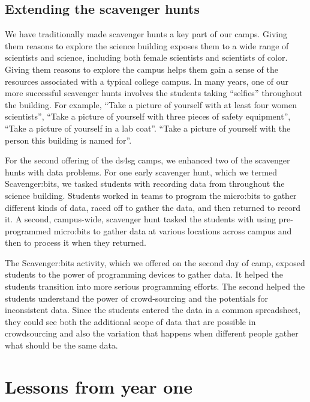 \subsection{Extending the scavenger hunts}

We have traditionally made scavenger hunts a key part of our camps.
Giving them reasons to explore the science building exposes them
to a wide range of scientists and science, including both female
scientists and scientists of color.  Giving them reasons to explore
the campus helps them gain a sense of the resources associated with
a typical college campus.  In many years, one of our more successful
scavenger hunts involves the students taking ``selfies'' throughout
the building.  For example, ``Take a picture of yourself with at
least four women scientists'', ``Take a picture of yourself with
three pieces of safety equipment'', ``Take a picture of yourself
in a lab coat''.  ``Take a picture of yourself with the person this
building is named for''.

For the second offering of the ds4sg camps, we enhanced two of the
scavenger hunts with data problems.  For one early scavenger hunt,
which we termed Scavenger:bits, we tasked students with recording
data from throughout the science building.  Students worked in teams
to program the micro:bits to gather different kinds of data, raced
off to gather the data, and then returned to record it.  A second,
campus-wide, scavenger hunt tasked the students with using
pre-programmed micro:bits to gather data at various locations across
campus and then to process it when they returned.

The Scavenger:bits activity, which we offered on the second
day of camp, exposed students to the power of programming devices
to gather data.  It helped the students transition into more serious
programming efforts.  The second helped the students understand the
power of crowd-sourcing and the potentials for inconsistent data.
Since the students entered the data in a common spreadsheet, they could
see both the additional scope of data that are possible in crowdsourcing
and also the variation that happens when different people gather
what should be the same data.

\section{Lessons from year one}

